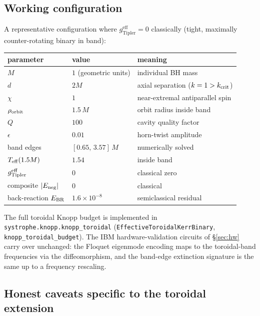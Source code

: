 \documentclass[11pt,a4paper]{article}
\begin{document}
\subsection{Working configuration}

A representative configuration where $g_{\mathrm{Tipler}}^{\mathrm{eff}}=0$ classically (tight, maximally counter-rotating binary in band):
\begin{center}
\begin{tabular}{lll}\toprule
parameter & value & meaning \\\midrule
$M$ & $1$ (geometric units) & individual BH mass \\
$d$ & $2M$ & axial separation ($k=1>k_{\rm crit}$) \\
$\chi$ & $1$ & near-extremal antiparallel spin \\
$\rho_{\rm orbit}$ & $1.5\,M$ & orbit radius inside band \\
$Q$ & $100$ & cavity quality factor \\
$\epsilon$ & $0.01$ & horn-twist amplitude \\\midrule
band edges & $[0.65,\,3.57]\,M$ & numerically solved \\
$T_{\rm eff}(1.5M)$ & $1.54$ & inside band \\
$g_{\rm Tipler}^{\rm eff}$ & $0$ & classical zero \\
composite $|E_{\rm neg}|$ & $0$ & classical \\
back-reaction $E_{\rm BR}$ & $1.6\times 10^{-8}$ & semiclassical residual \\\bottomrule
\end{tabular}
\end{center}

The full toroidal Knopp budget is implemented in \texttt{systrophe.knopp.knopp\_toroidal} (\texttt{EffectiveToroidalKerrBinary}, \texttt{knopp\_toroidal\_budget}). The IBM hardware-validation circuits of \S\ref{sec:hw} carry over unchanged: the Floquet eigenmode encoding maps to the toroidal-band frequencies via the diffeomorphism, and the band-edge extinction signature is the same up to a frequency rescaling.

\subsection{Honest caveats specific to the toroidal extension}
\end{document}
